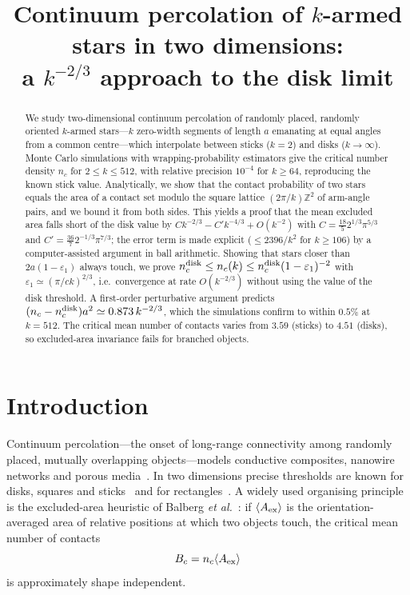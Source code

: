 \documentclass[pre,twocolumn,superscriptaddress,nofootinbib]{revtex4-2}
\newcommand{\Aex}{\langle A_{\rm ex}\rangle}
\newcommand{\nd}{n_c^{\rm disk}}
\begin{document}
\title{Continuum percolation of $k$-armed stars in two dimensions:\\ a $k^{-2/3}$ approach to the disk limit}



\begin{abstract}
We study two-dimensional continuum percolation of randomly placed, randomly oriented $k$-armed stars---$k$ zero-width segments of length $a$ emanating at equal angles from a common centre---which interpolate between sticks ($k=2$) and disks ($k\to\infty$).
Monte Carlo simulations with wrapping-probability estimators give the critical number density $n_c$ for $2\le k\le 512$, with relative precision $10^{-4}$ for $k\ge 64$, reproducing the known stick value.
Analytically, we show that the contact probability of two stars equals the area of a contact set modulo the square lattice $(2\pi/k)\mathbb{Z}^2$ of arm-angle pairs, and we bound it from both sides.
This yields a proof that the mean excluded area falls short of the disk value by
$Ck^{-2/3}-C'k^{-4/3}+O(k^{-2})$ with $C=\tfrac{18}{5}2^{1/3}\pi^{5/3}$ and $C'=\tfrac{36}{7}2^{-1/3}\pi^{7/3}$; the error term is made explicit ($\le 2396/k^2$ for $k\ge106$) by a computer-assisted argument in ball arithmetic.
Showing that stars closer than $2a(1-\varepsilon_1)$ always touch, we prove $\nd\le n_c(k)\le \nd(1-\varepsilon_1)^{-2}$ with $\varepsilon_1\simeq(\pi/ck)^{2/3}$, i.e.\ convergence at rate $O(k^{-2/3})$ without using the value of the disk threshold.
A first-order perturbative argument predicts $(n_c-\nd)a^2\simeq0.873\,k^{-2/3}$, which the simulations confirm to within $0.5\%$ at $k=512$.
The critical mean number of contacts varies from $3.59$ (sticks) to $4.51$ (disks), so excluded-area invariance fails for branched objects.
\end{abstract}

\maketitle

\section{Introduction}
Continuum percolation---the onset of long-range connectivity among randomly placed, mutually overlapping objects---models conductive composites, nanowire networks and porous media~\cite{Stauffer1994,Balberg1984}.
In two dimensions precise thresholds are known for disks, squares and sticks~\cite{Mertens2012,Baker2002,Pike1974} and for rectangles~\cite{Li2013}.
A widely used organising principle is the excluded-area heuristic of Balberg \textit{et al.}~\cite{Balberg1984}: if $\Aex$ is the orientation-averaged area of relative positions at which two objects touch, the critical mean number of contacts
\begin{equation}
B_c=n_c\Aex \label{eq:Bc}
\end{equation}
is approximately shape independent.
\end{document}
